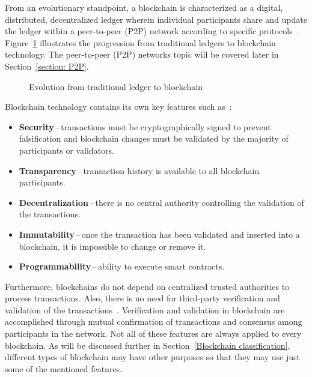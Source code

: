 From an evolutionary standpoint, a blockchain is characterized as a digital, distributed, decentralized ledger wherein individual participants share and update the ledger within a peer-to-peer (P2P) network according to specific protocols~\cite{vademecun.blockchain}. Figure~\ref{figure:bc.evolution} illustrates the progression from traditional ledgers to blockchain technology. The peer-to-peer (P2P) networks topic will be covered later in Section~\ref{section: P2P}.

\begin{figure}[h]
    \begin{center}
    \end{center}
    \caption{Evolution from traditional ledger to blockchain \cite{vademecun.blockchain}}
    \label{figure:bc.evolution}
\end{figure}

Blockchain technology contains its own key features such as~\cite{comprehensive.survey.blockchain}:
\begin{itemize}
    \item \textbf{Security}\,--\,transactions must be cryptographically signed to prevent falsification and blockchain changes must be validated by the majority of participants or validators.
    \item \textbf{Transparency}\,--\,transaction history is available to all blockchain participants.
    \item \textbf{Decentralization}\,--\,there is no central authority controlling the validation of the transactions.
    \item \textbf{Immutability}\,--\,once the transaction has been validated and inserted into a blockchain, it is impossible to change or remove it.
    \item \textbf{Programmability}\,--\,ability to execute smart contracts.
\end{itemize}

Furthermore, blockchains do not depend on centralized trusted authorities to process transactions. Also, there is no need for third-party verification and validation of the transactions~\cite{comprehensive.survey.blockchain}. Verification and validation in blockchain are accomplished through mutual confirmation of transactions and consensus among participants in the network. Not all of these features are always applied to every blockchain. As will be discussed further in Section~\ref{Blockchain classification}, different types of blockchain may have other purposes so that they may use just some of the mentioned features.

